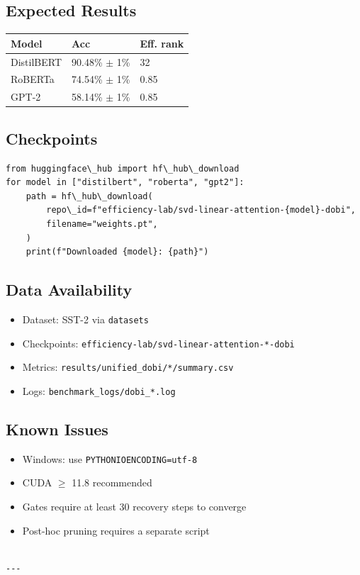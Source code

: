\subsection{Expected Results}

\begin{table}[H]
\centering
\small
\begin{tabular}{lll}
\toprule
\textbf{Model} & \textbf{Acc} & \textbf{Eff. rank} \\
\midrule
DistilBERT & 90.48\% $\pm$ 1\% & 32 \\
RoBERTa & 74.54\% $\pm$ 1\% & 0.85 \\
GPT-2 & 58.14\% $\pm$ 1\% & 0.85 \\
\bottomrule
\end{tabular}
\end{table}

\subsection{Checkpoints}

\begin{lstlisting}
from huggingface\_hub import hf\_hub\_download
for model in ["distilbert", "roberta", "gpt2"]:
    path = hf\_hub\_download(
        repo\_id=f"efficiency-lab/svd-linear-attention-{model}-dobi",
        filename="weights.pt",
    )
    print(f"Downloaded {model}: {path}")
\end{lstlisting}

\subsection{Data Availability}

\begin{itemize}
\item Dataset: SST-2 via \texttt{datasets}
\item Checkpoints: \texttt{efficiency-lab/svd-linear-attention-*-dobi}
\item Metrics: \texttt{results/unified\_dobi/*/summary.csv}
\item Logs: \texttt{benchmark\_logs/dobi\_*.log}

\end{itemize}
\subsection{Known Issues}

\begin{itemize}
\item Windows: use \texttt{PYTHONIOENCODING=utf-8}
\item CUDA $\ge$ 11.8 recommended
\item Gates require at least 30 recovery steps to converge
\item Post-hoc pruning requires a separate script
\end{itemize}
\begin{lstlisting}

---
\end{lstlisting}